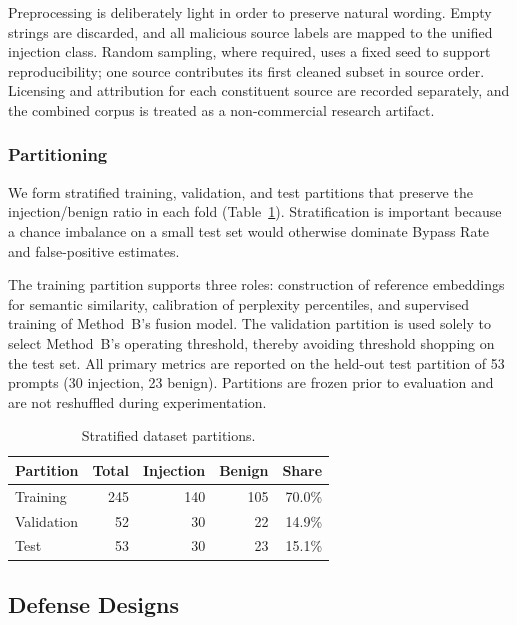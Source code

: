 ﻿\documentclass[10pt]{article}
\begin{document}
Preprocessing is deliberately light in order to preserve natural wording.
Empty strings are discarded, and all malicious source labels are mapped to the unified injection class.
Random sampling, where required, uses a fixed seed to support reproducibility; one source contributes its first cleaned subset in source order.
Licensing and attribution for each constituent source are recorded separately, and the combined corpus is treated as a non-commercial research artifact.

\subsubsection{Partitioning}

We form stratified training, validation, and test partitions that preserve the injection/benign ratio in each fold (Table~\ref{tab:splits}).
Stratification is important because a chance imbalance on a small test set would otherwise dominate Bypass Rate and false-positive estimates.

The training partition supports three roles: construction of reference embeddings for semantic similarity, calibration of perplexity percentiles, and supervised training of Method~B's fusion model.
The validation partition is used solely to select Method~B's operating threshold, thereby avoiding threshold shopping on the test set.
All primary metrics are reported on the held-out test partition of 53 prompts (30 injection, 23 benign).
Partitions are frozen prior to evaluation and are not reshuffled during experimentation.

\begin{table}[t]
  \centering
  \caption{Stratified dataset partitions.}
  \label{tab:splits}
  \begin{tabular}{lrrrr}
    \hline
    Partition & Total & Injection & Benign & Share \\
    \hline
    Training & 245 & 140 & 105 & 70.0\% \\
    Validation & 52 & 30 & 22 & 14.9\% \\
    Test & 53 & 30 & 23 & 15.1\% \\
    \hline
  \end{tabular}
\end{table}

\subsection{Defense Designs}
\label{sec:defenses}
\end{document}
